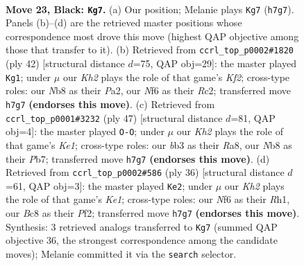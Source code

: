\documentclass[11pt]{article}
\begin{document}
\clearpage

\begin{figure}[p]\centering
\begin{subfigure}{0.46\textwidth}\centering
\resizebox{\linewidth}{!}{%
\newchessgame
\chessboard[
  setfen={rnb1rb2/ppp1p2k/5n2/P1P3N1/8/1B4R1/1P3P2/RNB1K3 b Q - 4 23},
  showmover=false,
  pgfstyle=straightmove, color=movearrow, markmove={h7-g7}
]}
\caption{}
\end{subfigure}\hfill
\begin{subfigure}{0.46\textwidth}\centering
\resizebox{\linewidth}{!}{%
\newchessgame
\chessboard[
  setfen={3k1r2/1bp1n1r1/pp2p2p/8/3P2p1/2NBP1P1/PPR2K1P/2R5 w - - 0 22},
  showmover=false,
  pgfstyle=straightmove, color=movearrow, markmove={f2-g1}
]}
\caption{}
\end{subfigure}
\\[4pt]
\begin{subfigure}{0.46\textwidth}\centering
\resizebox{\linewidth}{!}{%
\newchessgame
\chessboard[
  setfen={r2bk2r/1p5p/5np1/4p3/p1P5/P3B3/1P1N1PRP/1K1R4 b kq - 1 24},
  showmover=false,
  pgfstyle=straightmove, color=movearrow, markmove={e8-g8}
]}
\caption{}
\end{subfigure}\hfill
\begin{subfigure}{0.46\textwidth}\centering
\resizebox{\linewidth}{!}{%
\newchessgame
\chessboard[
  setfen={rn1r2k1/1p2pp1p/5b2/1B1P1p2/8/pRN1P3/P4PPP/4K2R w K - 0 19},
  showmover=false,
  pgfstyle=straightmove, color=movearrow, markmove={e1-e2}
]}
\caption{}
\end{subfigure}
\caption{\textbf{Move 23, Black: \texttt{Kg7}.} (a) Our position; Melanie plays \texttt{Kg7} (\texttt{h7g7}). Panels (b)--(d) are the retrieved master positions whose correspondence most drove this move (highest QAP objective among those that transfer to it). (b) Retrieved from \texttt{ccrl\_top\_p0002\#1820} (ply 42) [structural distance $d$=75, QAP obj=29]: the master played \texttt{Kg1}; under $\mu$ our \emph{Kh2} plays the role of that game's \emph{Kf2}; cross-type roles: our \emph{N}b8 as their \emph{P}a2, our \emph{N}f6 as their \emph{R}c2; transferred move \texttt{h7g7} \textbf{(endorses this move)}. (c) Retrieved from \texttt{ccrl\_top\_p0001\#3232} (ply 47) [structural distance $d$=81, QAP obj=4]: the master played \texttt{O-O}; under $\mu$ our \emph{Kh2} plays the role of that game's \emph{Ke1}; cross-type roles: our \emph{b}b3 as their \emph{R}a8, our \emph{N}b8 as their \emph{P}b7; transferred move \texttt{h7g7} \textbf{(endorses this move)}. (d) Retrieved from \texttt{ccrl\_top\_p0002\#586} (ply 36) [structural distance $d$=61, QAP obj=3]: the master played \texttt{Ke2}; under $\mu$ our \emph{Kh2} plays the role of that game's \emph{Ke1}; cross-type roles: our \emph{N}f6 as their \emph{R}h1, our \emph{B}c8 as their \emph{P}f2; transferred move \texttt{h7g7} \textbf{(endorses this move)}. Synthesis: 3 retrieved analogs transferred to \texttt{Kg7} (summed QAP objective 36, the strongest correspondence among the candidate moves); Melanie committed it via the \texttt{search} selector.}
\label{fig:thought-m45}
\end{figure}
\end{document}
